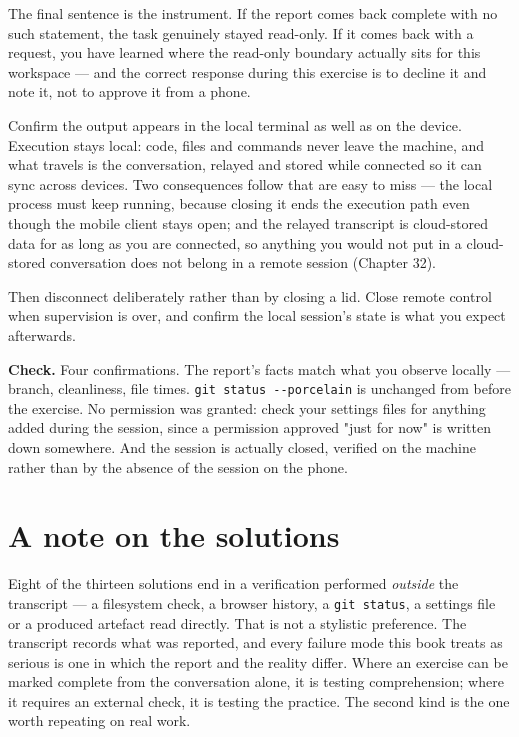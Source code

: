 \documentclass[11pt,a4paper,twoside,openany]{book}
\begin{document}
The final sentence is the instrument. If the report comes back complete with no such statement, the task genuinely stayed read-only. If it comes back with a request, you have learned where the read-only boundary actually sits for this workspace — and the correct response during this exercise is to decline it and note it, not to approve it from a phone.


Confirm the output appears in the local terminal as well as on the device. Execution stays local: code, files and commands never leave the machine, and what travels is the conversation, relayed and stored while connected so it can sync across devices. Two consequences follow that are easy to miss — the local process must keep running, because closing it ends the execution path even though the mobile client stays open; and the relayed transcript is cloud-stored data for as long as you are connected, so anything you would not put in a cloud-stored conversation does not belong in a remote session (Chapter 32).


Then disconnect deliberately rather than by closing a lid. Close remote control when supervision is over, and confirm the local session's state is what you expect afterwards.


\textbf{Check.} Four confirmations. The report's facts match what you observe locally — branch, cleanliness, file times. \texttt{git status -\allowbreak{}-\allowbreak{}porcelain} is unchanged from before the exercise. No permission was granted: check your settings files for anything added during the session, since a permission approved "just for now" is written down somewhere. And the session is actually closed, verified on the machine rather than by the absence of the session on the phone.


\FloatBarrier
\section*{A note on the solutions}

Eight of the thirteen solutions end in a verification performed \emph{outside} the transcript — a filesystem check, a browser history, a \texttt{git status}, a settings file or a produced artefact read directly. That is not a stylistic preference. The transcript records what was reported, and every failure mode this book treats as serious is one in which the report and the reality differ. Where an exercise can be marked complete from the conversation alone, it is testing comprehension; where it requires an external check, it is testing the practice. The second kind is the one worth repeating on real work.
\end{document}
